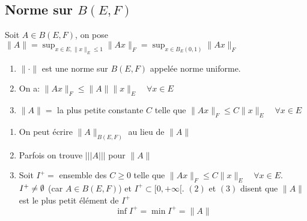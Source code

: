 \subsection{Norme sur $B(E, F)$}
\begin{theorem}
    Soit $A \in B(E, F)$, on pose $\displaystyle \|A\| = \sup_{x \in E, \|x\|_E \le 1} \|Ax\|_F = \sup_{x \in B_E(0, 1)} \|Ax\|_{F}$

    \begin{enumerate}
        \item $\| \cdot \|$ est une norme sur  $B(E, F)$ appelée norme uniforme.
        \item On a:  $\|Ax\|_F \le \|A\|\|x\|_{E} \quad \forall x \in E$
        \item $\|A\| = $ la plus petite constante  $C$ telle que  $\|Ax\|_{F} \le C\|x\|_{E} \quad \forall x \in E$
    \end{enumerate}
\end{theorem}
\begin{remark}
    \begin{enumerate}
        \item On peut écrire $\|A\|_{B(E, F)}$ au lieu de $\|A\|$ 
        \item Parfois on trouve $|||A|||$ pour $\|A\|$ 
        \item Soit $I^+ = $ ensemble des  $C \ge 0$ telle que $\|Ax\|_{F} \le C\|x\|_{E} \quad \forall x \in E$. \\
            $I^+ \neq \emptyset$ (car $A \in B(E, F)$) et $I^+ \subset [0, +\infty[$. $(2)$ et  $(3)$ disent que  $\|A\|$ est le plus petit élément de  $I^+$
             \[
            \inf I^+ = \min I^+ = \|A\|
            \] 
    \end{enumerate}
\end{remark}
